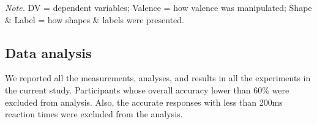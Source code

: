 \documentclass[
  english,
  man]{apa6}
\begin{document}
\begin{table}[tbp]
\begin{center}
\begin{threeparttable}
\begin{tablenotes}[para]
\normalsize{\textit{Note.} DV = dependent variables; Valence = how valence was manipulated; Shape \& Label = how shapes \& labels were presented.}
\end{tablenotes}

\end{threeparttable}
\end{center}

\end{table}

\hypertarget{data-analysis}{%
\subsection{Data analysis}\label{data-analysis}}

We reported all the measurements, analyses, and results in all the experiments in the current study. Participants whose overall accuracy lower than 60\% were excluded from analysis. Also, the accurate responses with less than 200ms reaction times were excluded from the analysis.
\end{document}
